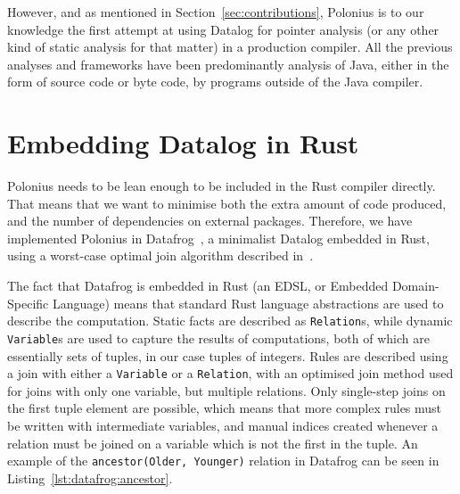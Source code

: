 \documentclass[11pt,a4paper,twoside,openany]{report}
\newcommand{\InRust}[1]{\texttt{#1}}
\newcommand{\InDatalog}[1]{\texttt{#1}}
\begin{document}
However, and as mentioned in Section~\ref{sec:contributions}, Polonius is to our
knowledge the first attempt at using Datalog for pointer analysis (or any other
kind of static analysis for that matter) in a production compiler. All the
previous analyses and frameworks have been predominantly analysis of Java,
either in the form of source code or byte code, by programs outside of the Java
compiler.

\section{Embedding Datalog in Rust}\label{sec:datafrog}

Polonius needs to be lean enough to be included in the Rust compiler directly.
That means that we want to minimise both the extra amount of code produced, and
the number of dependencies on external packages. Therefore, we have implemented
Polonius in Datafrog~\cite{datafrog}, a minimalist Datalog embedded in Rust,
using a worst-case optimal join algorithm described
in~\cite{ngo_worst-case_2012}.

The fact that Datafrog is embedded in Rust (an EDSL, or Embedded Domain-Specific
Language) means that standard Rust language abstractions are used to describe
the computation. Static facts are described as \InRust{Relation}s, while dynamic
\InRust{Variable}s are used to capture the results of computations, both of
which are essentially sets of tuples, in our case tuples of integers. Rules are
described using a join with either a \InRust{Variable} or a \InRust{Relation},
with an optimised join method used for joins with only one variable, but
multiple relations. Only single-step joins on the first tuple element are
possible, which means that more complex rules must be written with intermediate
variables, and manual indices created whenever a relation must be joined on a
variable which is not the first in the tuple. An example of the
\InDatalog{ancestor(Older, Younger)} relation in Datafrog can be seen in
Listing~\ref{lst:datafrog:ancestor}.
\end{document}
